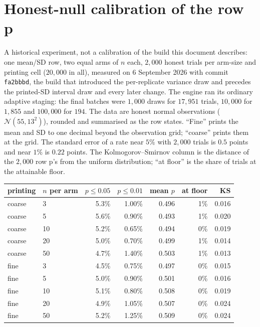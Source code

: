 \documentclass[11pt,a4paper]{article}
\begin{document}
\appendix
\section{Honest-null calibration of the row p}
\label{app:null}

A historical experiment, not a calibration of the build this document describes: one mean/SD row, two equal arms of $n$ each, $2{,}000$ honest trials per arm-size and printing cell ($20{,}000$ in all), measured on 6 September 2026 with commit \texttt{fa2bbbd}, the build that introduced the per-replicate variance draw and precedes the printed-SD interval draw and every later change. The engine ran its ordinary adaptive staging: the final batches were $1{,}000$ draws for $17{,}951$ trials, $10{,}000$ for $1{,}855$ and $100{,}000$ for $194$. The data are honest normal observations ($\mathcal{N}(55, 13^2)$), rounded and summarised as the row states. ``Fine'' prints the mean and SD to one decimal beyond the observation grid; ``coarse'' prints them at the grid. The standard error of a rate near $5\%$ with $2{,}000$ trials is $0.5$ points and near $1\%$ is $0.22$ points. The Kolmogorov--Smirnov column \citep{kolmogorov1933,smirnov1948} is the distance of the $2{,}000$ row p's from the uniform distribution; ``at floor'' is the share of trials at the attainable floor.

\begin{center}
\begin{tabular}{llrrrrr}
\toprule
printing & $n$ per arm & $p\le0.05$ & $p\le0.01$ & mean $p$ & at floor & KS \\
\midrule
coarse & 3  & 5.3\% & 1.00\% & 0.496 & 1\% & 0.016 \\
coarse & 5  & 5.6\% & 0.90\% & 0.493 & 1\% & 0.020 \\
coarse & 10 & 5.2\% & 0.65\% & 0.494 & 0\% & 0.019 \\
coarse & 20 & 5.0\% & 0.70\% & 0.499 & 1\% & 0.014 \\
coarse & 50 & 4.7\% & 1.40\% & 0.503 & 1\% & 0.013 \\
fine   & 3  & 4.5\% & 0.75\% & 0.497 & 0\% & 0.015 \\
fine   & 5  & 5.0\% & 0.90\% & 0.501 & 0\% & 0.016 \\
fine   & 10 & 5.1\% & 0.80\% & 0.508 & 0\% & 0.019 \\
fine   & 20 & 4.9\% & 1.05\% & 0.507 & 0\% & 0.024 \\
fine   & 50 & 5.2\% & 1.25\% & 0.509 & 0\% & 0.024 \\
\bottomrule
\end{tabular}
\end{center}
\end{document}
